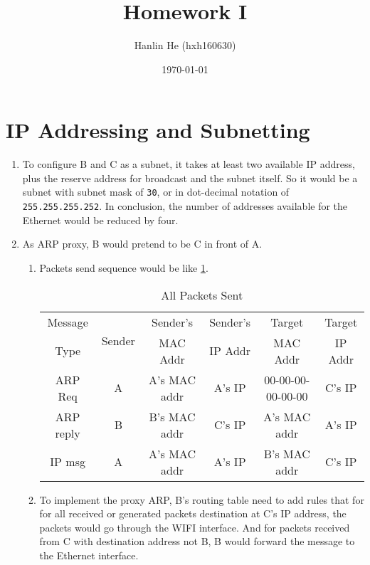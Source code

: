 \documentclass[12pt,titlepage,letterpaper]{article}
\title{Homework I}
\author{Hanlin He (hxh160630)}
\date{\today}
\begin{document}
\maketitle

\section{IP Addressing and Subnetting}
\begin{enumerate}[label=\bfseries\alph*)]
    \item To configure B and C as a subnet, it takes at least two available IP
        address, plus the reserve address for broadcast and the subnet itself.
        So it would be a subnet with subnet mask of \texttt{30}, or in
        dot-decimal notation of \texttt{255.255.255.252}. In conclusion, the
        number of addresses available for the Ethernet would be reduced by
        four.
    \item As ARP proxy, B would pretend to be C in front of A.
        \begin{enumerate}[label=\bfseries\roman*. ]
            \item Packets send sequence would be like \cref{1ai}.
                \begin{table}[H]
                \footnotesize
                \centering
                \caption{All Packets Sent}\label{1ai}
                \begin{tabular}{c|c|c|c|c|c}
                    Message & \multirow{2}{*}{Sender} & Sender's & Sender's &
                    Target & Target \\
                    Type & & MAC Addr & IP Addr & MAC Addr & IP Addr \\\hline\hline
                    ARP Req & A & A's MAC addr & A's IP & 00-00-00-00-00-00 &
                    C's IP \\
                    ARP reply & B & B's MAC addr & C's IP & A's MAC addr &
                    A's IP \\%
                    IP msg & A & A's MAC addr & A's IP & B's MAC addr &
                    C's IP 
                \end{tabular}
                \end{table}
            \item To implement the proxy ARP, B's routing table need to add
                rules that for for all received or generated packets
                destination at C's IP address, the packets would go through the
                WIFI interface. And for packets received from C with
                destination address not B, B would forward the message to the
                Ethernet interface.
        \end{enumerate}
\end{enumerate}
\end{document}
